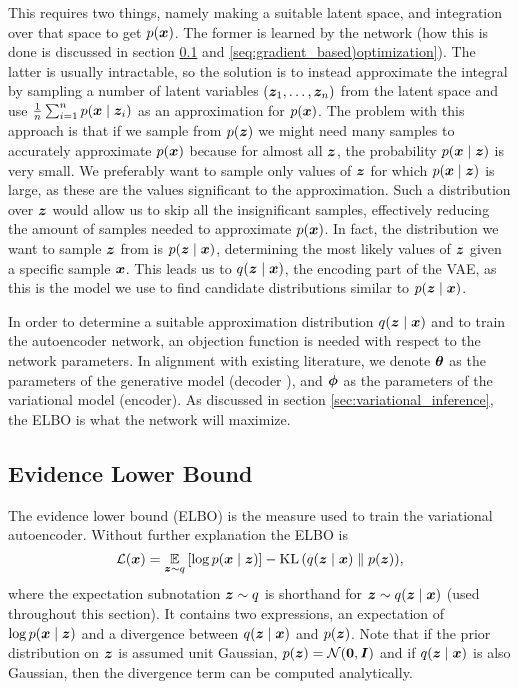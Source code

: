 This requires two things, namely making a suitable latent space, and integration over that space to get $p(\bm{ x })$. The former is learned by the network (how this is done is discussed in section \ref{sec:elbo} and \ref{seq:gradient_based)optimization}). The latter is usually intractable, so the solution is to instead approximate the integral by sampling a number of latent variables $(\bm{ z }_1, \ldots, \bm{ z }_n)$ from the latent space and use $\frac{1}{n}\sum_{i = 1}^n p(\bm{ x } \mid \bm{ z }_i)$ as an approximation for $p(\bm{ x })$. The problem with this approach is that if we sample from $p(\bm{ z })$ we might need many samples to accurately approximate $p(\bm{ x })$ because for almost all $\bm{ z }$, the probability $p(\bm{ x } \mid \bm{ z })$ is very small. We preferably want to sample only values of $\bm{ z }$ for which $p(\bm{ x } \mid \bm{ z })$ is large, as these are the values significant to the approximation. Such a distribution over $\bm{ z }$ would allow us to skip all the insignificant samples, effectively reducing the amount of samples needed to approximate $p(\bm{ x })$. In fact, the distribution we want to sample $\bm{ z }$ from is $p(\bm{ z } \mid \bm{ x })$, determining the most likely values of $\bm{ z }$ given a specific sample $\bm{ x }$. This leads us to $q(\bm{ z } \mid \bm{ x })$, the encoding part of the VAE, as this is the model we use to find candidate distributions similar to $p(\bm{ z } \mid \bm{ x })$.

In order to determine a suitable approximation distribution $q(\bm{ z } \mid \bm{ x })$ and to train the autoencoder network, an objection function is needed with respect to the network parameters. In alignment with existing literature, we denote $\bm{ \theta }$ as the parameters of the generative model (decoder ), and $\bm{ \phi }$ as the parameters of the variational model (encoder). As discussed in section \ref{sec:variational_inference}, the ELBO is what the network will maximize.

\subsection{Evidence Lower Bound}
\label{sec:elbo}
The evidence lower bound (ELBO) is the measure used to train the variational autoencoder. Without further explanation the ELBO is
\begin{equation}
    \mathcal{L}(\bm{ x }) = \operatorname*{\mathbb{E}}_{\bm{ z }\sim q}{\mathopen{} \left[ \log p(\bm{ x } \mid \bm{ z }) \right] \mathclose{}} - \operatorname{KL}{\mathopen{} \left(q(\bm{ z } \mid \bm{ x }) \parallel p(\bm{ z })\right) \mathclose{}}\label{eq:elbo},
\end{equation}
where the expectation subnotation $\bm{ z } \sim q$ is shorthand for $\bm{ z } \sim q(\bm{ z } \mid \bm{ x })$ (used throughout this section). It contains two expressions, an expectation of $\log p(\bm{ x } \mid \bm{ z })$ and a divergence between $q(\bm{ z } \mid \bm{ x })$ and $p(\bm{ z })$. Note that if the prior distribution on $\bm{ z }$ is assumed unit Gaussian, $p(\bm{ z }) = \mathcal{N}(\bm{ 0 }, \bm{ I })$ and if $q(\bm{ z } \mid \bm{ x })$ is also Gaussian, then the divergence term can be computed analytically.

